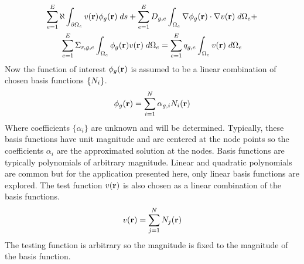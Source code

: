     \begin{multline} \label{eq:element_boundary}
      \sum_{e=1}^{E} \aleph \int_{\partial \Omega_e} v(\mathbf{r}) 
        \phi_g(\mathbf{r}) \;ds + \sum_{e=1}^{E} D_{g,e}
        \int_{\Omega_e} \mathbf{\nabla} \phi_g(\mathbf{r}) \cdot \mathbf{\nabla} v(\mathbf{r}) \; d\Omega_e + \\
        \sum_{e=1}^{E} \Sigma_{r,g,e} \int_{\Omega_e} \phi_g(\mathbf{r}) v(\mathbf{r}) 
        \; d\Omega_e =
        \sum_{e=1}^{E} q_{g,e} \int_{\Omega_e} v(\mathbf{r}) \; d\Omega_e
    \end{multline}
    Now the function of interest $\phi_g(\mathbf{r})$ is assumed to be a linear 
    combination of chosen basis functions $\{N_i\}$.
    \begin{equation} \label{eq:linear_combination}
      \phi_g(\mathbf{r}) = \sum_{i=1}^{N} \alpha_{g,i} N_i(\mathbf{r})
    \end{equation}
    Where coefficients $\{\alpha_i\}$ are unknown and will be determined. 
    Typically, these basis functions have unit magnitude and are centered at the
    node  points so the coefficients $\alpha_i$ are the approximated solution at
    the nodes. Basis functions are typically polynomials of arbitrary magnitude. 
    Linear and quadratic polynomials are common but for the application 
    presented here, only linear basis functions are explored.
    The test function $v(\mathbf{r})$ is also chosen as a linear combination of the 
    basis functions.
    \begin{equation} \label{eq:linear_superposition}
      v(\mathbf{r}) = \sum_{j=1}^{N} N_j(\mathbf{r})
    \end{equation}
    The testing function is arbitrary so the magnitude is fixed to the magnitude
    of the basis function.
    
